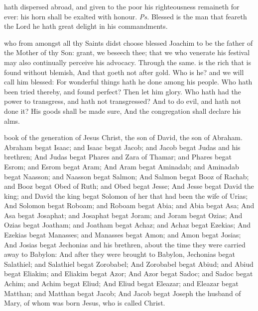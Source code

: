 \introit
{} hath dispersed abroad, and given to the poor his righteousness remaineth for ever: his horn shall be exalted with honour. \textit{Ps.} Blessed is the man that feareth the Lord he hath great delight in his commandments.

\collect
{} who from amongst all thy Saints didst choose blessed Joachim to be the father of the Mother of thy Son: grant, we beseech thee; that we who venerate his festival may also continually perceive his advocacy. Through the same.
 is the rich that is found without blemish, And that goeth not after gold. Who is he? and we will call him blessed: For wonderful things hath he done among his people. Who hath been tried thereby, and found perfect? Then let him glory. Who hath had the power to transgress, and hath not transgressed? And to do evil, and hath not done it? His goods shall be made sure, And the congregation shall declare his alms.


 book of the generation of Jesus Christ, the son of David, the son of Abraham. Abraham begat Isaac; and Isaac begat Jacob; and Jacob begat Judas and his brethren; And Judas begat Phares and Zara of Thamar; and Phares begat Esrom; and Esrom begat Aram; And Aram begat Aminadab; and Aminadab begat Naasson; and Naasson begat Salmon; And Salmon begat Booz of Rachab; and Booz begat Obed of Ruth; and Obed begat Jesse; And Jesse begat David the king; and David the king begat Solomon of her that had been the wife of Urias; And Solomon begat Roboam; and Roboam begat Abia; and Abia begat Asa; And Asa begat Josaphat; and Josaphat begat Joram; and Joram begat Ozias; And Ozias begat Joatham; and Joatham begat Achaz; and Achaz begat Ezekias; And Ezekias begat Manasses; and Manasses begat Amon; and Amon begat Josias; And Josias begat Jechonias and his brethren, about the time they were carried away to Babylon: And after they were brought to Babylon, Jechonias begat Salathiel; and Salathiel begat Zorobabel; And Zorobabel begat Abiud; and Abiud begat Eliakim; and Eliakim begat Azor; And Azor begat Sadoc; and Sadoc begat Achim; and Achim begat Eliud; And Eliud begat Eleazar; and Eleazar begat Matthan; and Matthan begat Jacob; And Jacob begat Joseph the husband of Mary, of whom was born Jesus, who is called Christ.

